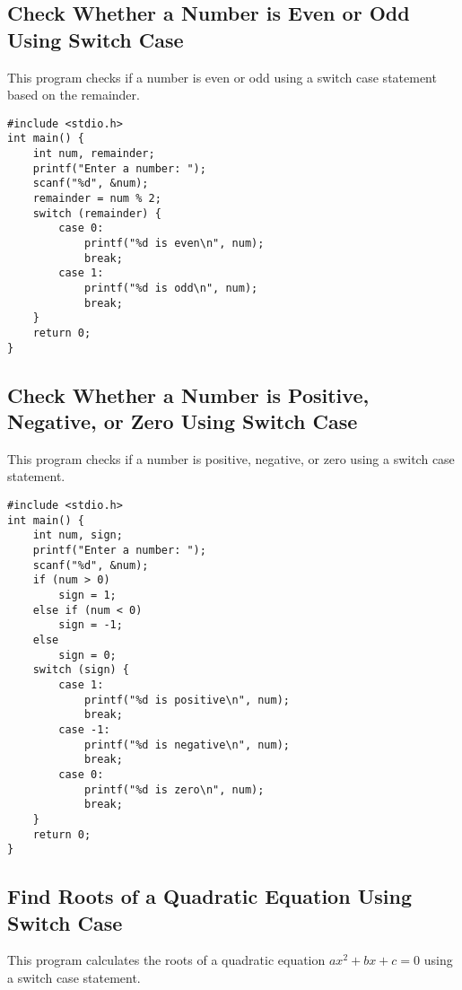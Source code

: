 \documentclass[a4paper,12pt]{article}
\begin{document}
\newpage

\subsection{Check Whether a Number is Even or Odd Using Switch Case}
This program checks if a number is even or odd using a switch case statement based on the remainder.

\begin{lstlisting}[caption={Check Whether a Number is Even or Odd Using Switch Case}]
#include <stdio.h>
int main() {
    int num, remainder;
    printf("Enter a number: ");
    scanf("%d", &num);
    remainder = num % 2;
    switch (remainder) {
        case 0:
            printf("%d is even\n", num);
            break;
        case 1:
            printf("%d is odd\n", num);
            break;
    }
    return 0;
}
\end{lstlisting}

\newpage

\subsection{Check Whether a Number is Positive, Negative, or Zero Using Switch Case}
This program checks if a number is positive, negative, or zero using a switch case statement.

\begin{lstlisting}[caption={Check Whether a Number is Positive, Negative, or Zero Using Switch Case}]
#include <stdio.h>
int main() {
    int num, sign;
    printf("Enter a number: ");
    scanf("%d", &num);
    if (num > 0)
        sign = 1;
    else if (num < 0)
        sign = -1;
    else
        sign = 0;
    switch (sign) {
        case 1:
            printf("%d is positive\n", num);
            break;
        case -1:
            printf("%d is negative\n", num);
            break;
        case 0:
            printf("%d is zero\n", num);
            break;
    }
    return 0;
}
\end{lstlisting}

\newpage

\subsection{Find Roots of a Quadratic Equation Using Switch Case}
This program calculates the roots of a quadratic equation \(ax^2 + bx + c = 0\) using a switch case statement.
\end{document}
